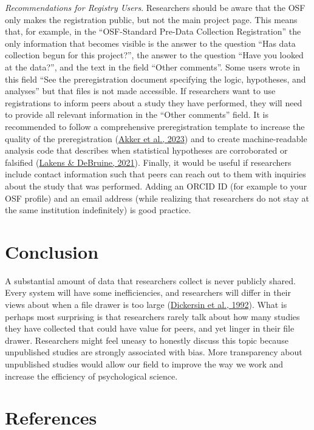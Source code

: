 \documentclass[
  ,jou, a4paper,floatsintext]{apa6}
\begin{document}
\emph{Recommendations for Registry Users}. Researchers should be aware that the OSF only makes the registration public, but not the main project page. This means that, for example, in the ``OSF-Standard Pre-Data Collection Registration'' the only information that becomes visible is the answer to the question ``Has data collection begun for this project?'', the answer to the question ``Have you looked at the data?'', and the text in the field ``Other comments''. Some users wrote in this field ``See the preregistration document specifying the logic, hypotheses, and analyses'' but that files is not made accessible. If researchers want to use registrations to inform peers about a study they have performed, they will need to provide all relevant information in the ``Other comments'' field. It is recommended to follow a comprehensive preregistration template to increase the quality of the preregistration (\protect\hyperlink{ref-akker_effectiveness_2023}{Akker et al., 2023}) and to create machine-readable analysis code that describes when statistical hypotheses are corroborated or falsified (\protect\hyperlink{ref-lakens_improving_2021}{Lakens \& DeBruine, 2021}). Finally, it would be useful if researchers include contact information such that peers can reach out to them with inquiries about the study that was performed. Adding an ORCID ID (for example to your OSF profile) and an email address (while realizing that researchers do not stay at the same institution indefinitely) is good practice.

\hypertarget{conclusion}{%
\section{Conclusion}\label{conclusion}}

A substantial amount of data that researchers collect is never publicly shared. Every system will have some inefficiencies, and researchers will differ in their views about when a file drawer is too large (\protect\hyperlink{ref-dickersin_factors_1992}{Dickersin et al., 1992}). What is perhaps most surprising is that researchers rarely talk about how many studies they have collected that could have value for peers, and yet linger in their file drawer. Researchers might feel uneasy to honestly discuss this topic because unpublished studies are strongly associated with bias. More transparency about unpublished studies would allow our field to improve the way we work and increase the efficiency of psychological science.

\hypertarget{references}{%
\section{References}\label{references}}
\end{document}
